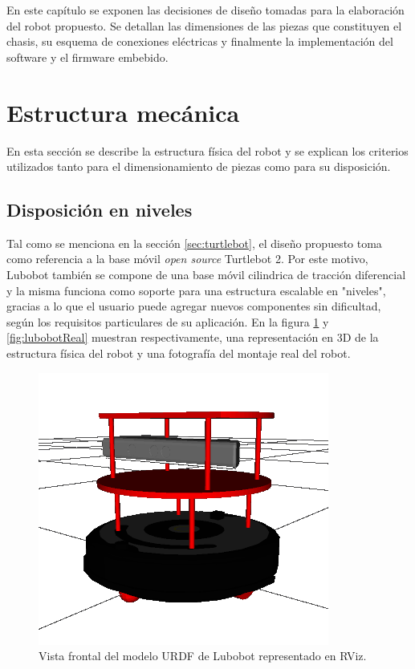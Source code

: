 \label{Capitulo3}

En este capítulo se exponen las decisiones de diseño tomadas para la elaboración del robot propuesto. Se detallan las dimensiones de las piezas que constituyen el chasis, su esquema de conexiones eléctricas y finalmente la implementación del software y el firmware embebido.

\section{Estructura mecánica}

En esta sección se describe la estructura física del robot y se explican los criterios utilizados tanto para el dimensionamiento de piezas como para su disposición.

\subsection{Disposición en niveles}
Tal como se menciona en la sección \ref{sec:turtlebot}, el diseño propuesto toma como referencia a la base móvil \textit{open source} Turtlebot 2. Por este motivo, Lubobot también se compone de una base móvil cilindrica de tracción diferencial y la misma funciona como soporte para una estructura escalable en "niveles", gracias a lo que el usuario puede agregar nuevos componentes sin dificultad, según los requisitos particulares de su aplicación. En la figura \ref{fig:lubobotURDF} y \ref{fig:lubobotReal} muestran respectivamente, una representación en 3D de la estructura física del robot y una fotografía del montaje real del robot.

\begin{figure}[ht]
  \centering
  \includegraphics[scale=0.5]{./Figures/lubobot_urdf.png}
  \caption{Vista frontal del modelo URDF de Lubobot representado en RViz.}
  \label{fig:lubobotURDF}
\end{figure}

